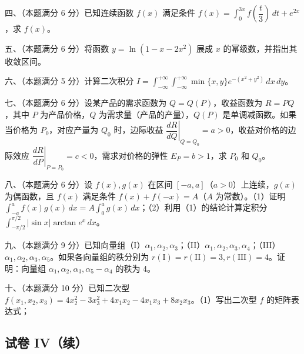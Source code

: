 \documentclass[UTF8,12pt]{ctexart}
\begin{document}
四、（本题满分 6 分）已知连续函数 \(\displaystyle f(x)\) 满足条件 \(\displaystyle f(x)=\displaystyle \int_0^{3x}f\left(\dfrac{\displaystyle t}{\displaystyle 3}\right)\,dt+e^{2x}\)，求 \(\displaystyle f(x)\)。


五、（本题满分 6 分）将函数 \(\displaystyle y=\ln(1-x-2x^2)\) 展成 \(\displaystyle x\) 的幂级数，并指出其收敛区间。


六、（本题满分 5 分）计算二次积分 \(\displaystyle I=\displaystyle \int_{-\infty}^{+\infty}\displaystyle \int_{-\infty}^{+\infty}\displaystyle \min\{x,\allowbreak y\}e^{-(x^2+y^2)}\,dx\,dy\)。


七、（本题满分 6 分）设某产品的需求函数为 \(\displaystyle Q=Q(P)\)，收益函数为 \(\displaystyle R=PQ\)，其中 \(\displaystyle P\) 为产品价格，\(\displaystyle Q\) 为需求量（产品的产量），\(\displaystyle Q(P)\) 是单调减函数。如果当价格为 \(\displaystyle P_0\)，对应产量为 \(\displaystyle Q_0\) 时，边际收益 \(\displaystyle \left.\dfrac{\displaystyle dR}{\displaystyle dQ}\right|_{Q=Q_0}=a>0\)，收益对价格的边际效应 \(\displaystyle \left.\dfrac{\displaystyle dR}{\displaystyle dP}\right|_{P=P_0}=c<0\)，需求对价格的弹性 \(\displaystyle E_P=b>1\)，求 \(\displaystyle P_0\) 和 \(\displaystyle Q_0\)。


八、（本题满分 6 分）设 \(\displaystyle f(x),\allowbreak g(x)\) 在区间 \(\displaystyle [-a,\allowbreak a]\)（\(\displaystyle a>0\)）上连续，\(\displaystyle g(x)\) 为偶函数，且 \(\displaystyle f(x)\) 满足条件 \(\displaystyle f(x)+f(-x)=A\)（\(\displaystyle A\) 为常数）。（1）证明 \(\displaystyle \int_{-a}^a f(x)g(x)\,dx=A\displaystyle \int_0^a g(x)\,dx\)；（2）利用（1）的结论计算定积分 \(\displaystyle \int_{-\pi/2}^{\pi/2}|\sin x|\arctan e^x\,dx\)。


九、（本题满分 9 分）已知向量组（I）\(\displaystyle \alpha_1,\allowbreak \alpha_2,\allowbreak \alpha_3\)；（II）\(\displaystyle \alpha_1,\allowbreak \alpha_2,\allowbreak \alpha_3,\allowbreak \alpha_4\)；（III）\(\displaystyle \alpha_1,\allowbreak \alpha_2,\allowbreak \alpha_3,\allowbreak \alpha_5\)。如果各向量组的秩分别为 \(\displaystyle r(\mathrm I)=r(\mathrm{II})=3,\allowbreak  r(\mathrm{III})=4\)。证明：向量组 \(\displaystyle \alpha_1,\allowbreak \alpha_2,\allowbreak \alpha_3,\allowbreak \alpha_5-\alpha_4\) 的秩为 4。


十、（本题满分 10 分）已知二次型 \(\displaystyle f(x_1,\allowbreak x_2,\allowbreak x_3)=4x_2^2-3x_3^2+4x_1x_2-4x_1x_3+8x_2x_3\)。（1）写出二次型 \(\displaystyle f\) 的矩阵表达式；


\subsection*{试卷 IV（续）}
\end{document}
